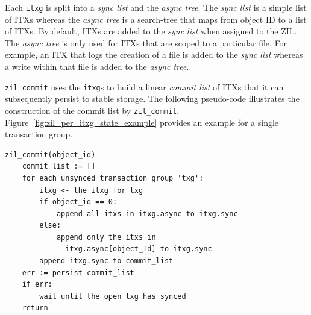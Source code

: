 \documentclass[12pt,a4paper,twoside]{book}
\begin{document}
Each \lstinline{itxg} is split into a \textit{sync list} and the \textit{async tree}.
The \textit{sync list} is a simple list of ITXs whereas the \textit{async tree} is a search-tree that maps from object ID to a list of ITXs.
By default, ITXs are added to the \textit{sync list} when assigned to the ZIL.
The \textit{async tree} is only used for ITXs that are scoped to a particular file.
For example, an ITX that logs the creation of a file is added to the \textit{sync list} whereas a write within that file is added to the \textit{async tree}.

\lstinline{zil_commit} uses the \lstinline{itxg}s to build a linear \textit{commit list} of ITXs that it can subsequently persist to stable storage.
The following pseudo-code illustrates the construction of the commit list by \lstinline{zil_commit}.
Figure~\ref{fig:zil_per_itxg_state_example} provides an example for a single transaction group.

\begin{lstlisting}
zil_commit(object_id)
    commit_list := []
    for each unsynced transaction group 'txg':
        itxg <- the itxg for txg
        if object_id == 0:
            append all itxs in itxg.async to itxg.sync
        else:
            append only the itxs in
              itxg.async[object_Id] to itxg.sync
        append itxg.sync to commit_list
    err := persist commit_list
    if err:
        wait until the open txg has synced
    return
\end{lstlisting}
\end{document}
